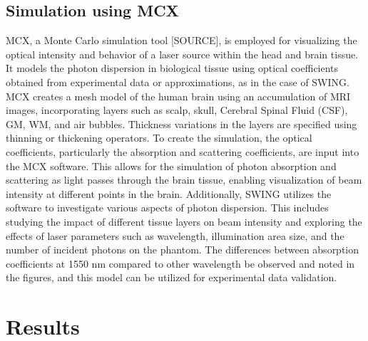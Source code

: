 \documentclass[journal,twoside,web]{ieeecolor}
\begin{document}

\subsection{Simulation using MCX}
MCX, a Monte Carlo simulation tool [SOURCE], is employed for visualizing the optical intensity and behavior of a laser source within the head and brain tissue. It models the photon dispersion in biological tissue using optical 
coefficients obtained from experimental data or approximations, as in the case of SWING. MCX creates a mesh model of the human brain using an accumulation of MRI images, incorporating layers such as scalp, skull, Cerebral Spinal Fluid (CSF), GM, WM, and air bubbles. Thickness variations in the layers are specified using thinning or thickening operators.
To create the simulation, the optical coefficients, particularly the absorption and scattering coefficients, are input into the MCX software. This allows for the simulation of photon absorption and scattering as light passes through the brain tissue, enabling visualization of beam intensity at different points in the brain.
Additionally, SWING utilizes the software to investigate various aspects of photon dispersion. This includes studying the impact of different tissue layers on beam intensity and exploring the effects of laser parameters such as wavelength, illumination area size, and the number of incident photons on the phantom.  The differences between absorption coefficients at 1550 nm compared to other wavelength be observed and noted in the figures, and this model can be utilized for experimental data validation.

\section{Results}
\label{sec:results}
\end{document}

